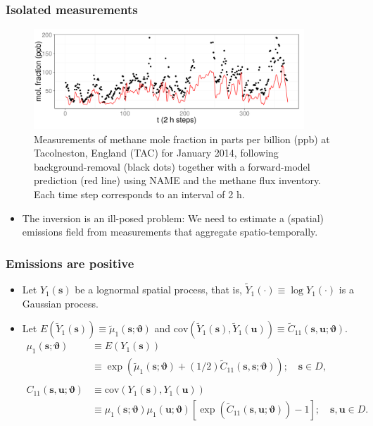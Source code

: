 \documentclass{beamer}
\newcommand{\svec} {\textbf{s}}
\newcommand{\uvec} {\textbf{u}}
\newcommand{\s}{\mathbf{s}}
\renewcommand{\u}{\mathbf{u}}
\newcommand{\E}{E}
\newcommand{\cov}{\mathrm{cov}}
\newcommand{\varthetab} {{\boldsymbol{\vartheta}}}
\begin{document}
\begin{frame}
\frametitle{Isolated measurements}

\begin{center}
\begin{figure}
\includegraphics[width=4in]{TAC_01.png}
\caption{Measurements of methane mole fraction in parts per billion (ppb) at Tacolneston, England (TAC) for January 2014, following background-removal (black dots) together with a forward-model prediction (red line) using NAME and the methane flux inventory. Each time step corresponds to an interval of 2 h.}
\end{figure}
\end{center}

\vspace{-1cm}

\begin{itemize}
\small
\item The inversion is an ill-posed problem: We need to estimate a (spatial) emissions field from measurements that aggregate spatio-temporally.
\end{itemize}

\normalsize

\end{frame}

\begin{frame}
\frametitle{Emissions are positive}

\begin{itemize}

\item Let $Y_1(\svec)$ be a lognormal spatial process, that is, $\widetilde{Y}_1(\cdot) \equiv \log Y_1(\cdot)$ is a Gaussian process.
\item Let $\E(\widetilde{Y}_1(\s)) \equiv \widetilde\mu_1(\s;\varthetab)$ and $\cov(\widetilde{Y}_1(\s),\widetilde{Y}_1(\u)) \equiv \widetilde{C}_{11}(\s,\u; \varthetab)$.
\begin{align*}
\mu_1(\s;\varthetab) &\equiv \E(Y_1(\s)) \\ &\equiv  \exp(\widetilde{\mu}_1(\svec;\varthetab) + (1/2)\widetilde{C}_{11}(\s,\s;\varthetab)); \quad \svec \in D,\\
&\\
 C_{11}(\s,\u;\varthetab) &\equiv \cov(Y_1(\s),Y_1(\u))
\\&\equiv \mu_1(\s;\varthetab)\mu_1(\u;\varthetab)[\exp(\widetilde{C}_{11}(\s,\u;\varthetab)) - 1] ; \quad \svec,\uvec \in D.
\end{align*}
\end{itemize}

\end{frame}
\end{document}

